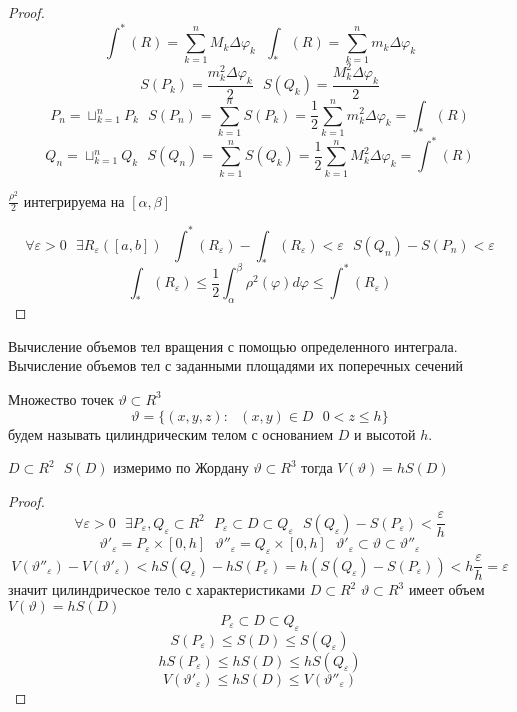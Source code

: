\begin{proof}
  $$
  \int^* (R) = \sum_{k=1}^n M_k \Delta \varphi_k ~~~
  \int_* (R) = \sum_{k=1}^n m_k \Delta \varphi_k
  $$
  $$
  S(P_k) = \frac{m_k^2 \Delta \varphi_k}{2} ~~~
  S(Q_k) = \frac{M_k^2 \Delta \varphi_k}{2}
  $$
  $$
  P_n = \sqcup_{k=1}^n P_k ~~~
  S(P_n) = \sum_{k=1}^n S(P_k) = \frac{1}{2} \sum_{k=1}^n m_k^2
  \Delta \varphi_k = \int_* (R)
  $$
  $$
  Q_n = \sqcup_{k=1}^n Q_k ~~~
  S(Q_n) = \sum_{k=1}^n S(Q_k) = \frac{1}{2} \sum_{k=1}^n M_k^2
  \Delta \varphi_k = \int^* (R)
  $$

  $\frac{\rho^2}{2}$ интегрируема на $[\alpha, \beta]$

  $$
  \forall \varepsilon > 0 ~~~ \exists R_{\varepsilon} ([a,b]) ~~~
  \int^* (R_{\varepsilon}) - \int_* (R_{\varepsilon}) < \varepsilon ~~~
  S(Q_n) - S(P_n) < \varepsilon
  $$
  $$
  \int_* (R_{\varepsilon}) \le
  \frac{1}{2} \int_{\alpha}^{\beta} \rho^2(\varphi) d\varphi \le
  \int^* (R_{\varepsilon})
  $$
\end{proof}

\begin{title}[\Large]
  Вычисление объемов тел вращения с помощью определенного интеграла. Вычисление
  объемов тел с заданными площадями их поперечных сечений
\end{title}

\begin{defin}[цилиндра]
  Множество точек $\vartheta \subset R^3$
  $$
  \vartheta = \{ (x,y,z): ~~~ (x,y) \in D ~~~ 0 < z \le h\}
  $$
  будем называть цилиндрическим телом с основанием $D$ и высотой $h$.
\end{defin}

\begin{theorem}
  $D \subset R^2 ~~~ S(D)$ измеримо по Жордану $\vartheta \subset R^3$ тогда
  $V(\vartheta) = h S(D)$
\end{theorem}

\begin{proof}
  $$
  \forall \varepsilon > 0 ~~~
  \exists P_{\varepsilon}, Q_{\varepsilon} \subset R^2 ~~~
  P_{\varepsilon} \subset D \subset Q_{\varepsilon} ~~~
  S(Q_{\varepsilon}) - S(P_{\varepsilon}) < \frac{\varepsilon}{h}
  $$
  $$
  \vartheta'_{\varepsilon} = P_{\varepsilon} \times [0,h] ~~~
  \vartheta''_{\varepsilon} = Q_{\varepsilon} \times [0,h] ~~~
  \vartheta'_{\varepsilon} \subset \vartheta \subset \vartheta''_{\varepsilon}
  $$
  $$
  V(\vartheta''_{\varepsilon}) - V(\vartheta'_{\varepsilon}) <
  h S(Q_{\varepsilon}) - h S(P_{\varepsilon}) =
  h (S(Q_{\varepsilon}) - S(P_{\varepsilon})) <
  h \frac{\varepsilon}{h} = \varepsilon
  $$
  значит цилиндрическое тело с характеристиками $D \subset R^2$
  $\vartheta \subset R^3$ имеет объем $V(\vartheta) = h S(D)$
  $$
  P_{\varepsilon} \subset D \subset Q_{\varepsilon}
  $$
  $$
  S(P_{\varepsilon}) \le S(D) \le S(Q_{\varepsilon})
  $$
  $$
  hS(P_{\varepsilon}) \le hS(D) \le hS(Q_{\varepsilon})
  $$
  $$
  V(\vartheta'_{\varepsilon}) \le h S(D) \le V(\vartheta''_{\varepsilon})
  $$
\end{proof}

